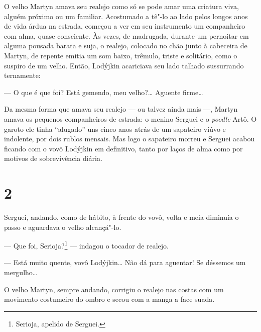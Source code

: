 O velho Martyn amava seu realejo como só se pode amar uma criatura viva,
alguém próximo ou um familiar. Acostumado a tê"-lo ao lado pelos longos
anos de vida árdua na estrada, começou a ver em seu instrumento um
companheiro com alma, quase consciente. Às vezes, de madrugada, durante
um pernoitar em alguma pousada barata e suja, o realejo, colocado no
chão junto à cabeceira de Martyn, de repente emitia um som baixo,
trêmulo, triste e solitário, como o suspiro de um velho. Então, Lodýjkin
acariciava seu lado talhado sussurrando ternamente:

--- O que é que foi? Está gemendo, meu velho?\ldots{} Aguente firme\ldots{}

Da mesma forma que amava seu realejo --- ou talvez ainda mais ---,
Martyn amava os pequenos companheiros de estrada: o menino Serguei e o
\emph{poodle} Artô. O garoto ele tinha ``alugado'' uns cinco anos atrás
de um sapateiro viúvo e indolente, por dois rublos mensais. Mas logo o
sapateiro morreu e Serguei acabou ficando com o vovô Lodýjkin em
definitivo, tanto por laços de alma como por motivos de sobrevivência
diária.

\section{2}


Serguei, andando, como de hábito, à frente do vovô, volta e meia
diminuía o passo e aguardava o velho alcançá"-lo.

--- Que foi, Serioja?\footnote{Serioja, apelido de Serguei.} --- indagou
o tocador de realejo.

--- Está muito quente, vovô Lodýjkin\ldots{} Não dá para aguentar! Se
déssemos um mergulho\ldots{}

O velho Martyn, sempre andando, corrigiu o realejo nas costas com um
movimento costumeiro do ombro e secou com a manga a face suada.

